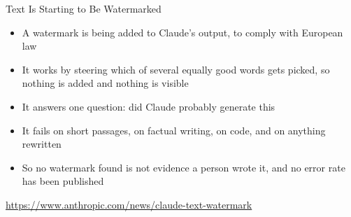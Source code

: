 \documentclass[aspectratio=169]{beamer}
\begin{document}
\begin{frame}{Text Is Starting to Be Watermarked}
    \begin{itemize}\setlength{\itemsep}{6pt}
        \item A watermark is being added to Claude's output, to comply with European law
        \item It works by steering which of several equally good words gets picked, so
              nothing is added and nothing is visible
        \item It answers one question: did Claude probably generate this
        \item It fails on short passages, on factual writing, on code, and on anything
              rewritten
        \item So no watermark found is not evidence a person wrote it, and no error rate has
              been published
    \end{itemize}

    \vspace{0.6em}
    {\small \url{https://www.anthropic.com/news/claude-text-watermark}}
\end{frame}
\end{document}
